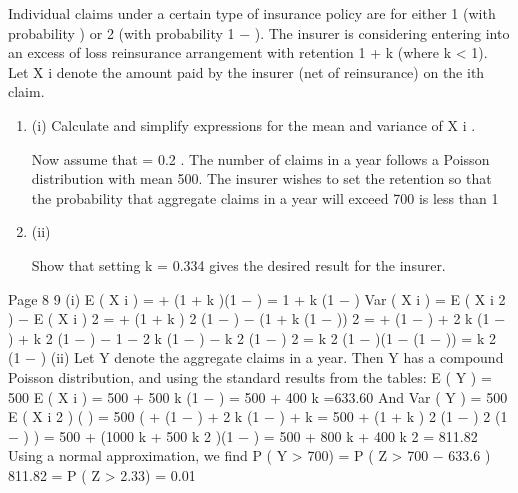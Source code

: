 



Individual claims under a certain type of insurance policy are for either 1 (with probability \alpha ) or 2 (with probability 1 − \alpha ).
The insurer is considering entering into an excess of loss reinsurance arrangement with retention 1 + k (where k < 1). Let X i denote the amount paid by the insurer (net
of reinsurance) on the ith claim.
\begin{enumerate}
\item (i) 
Calculate and simplify expressions for the mean and variance of X i .

Now assume that \alpha  = 0.2 . The number of claims in a year follows a Poisson distribution with mean 500. The insurer wishes to set the retention so that the
probability that aggregate claims in a year will exceed 700 is less than 1%
\item (ii) 

Show that setting k = 0.334 gives the desired result for the insurer.
\end{enumerate}


Page 8%
9
(i)
E ( X i ) = \alpha  + (1 + k )(1 − \alpha  )
= 1 + k (1 − \alpha  )
Var ( X i ) = E ( X i 2 ) − E ( X i ) 2
= \alpha  + (1 + k ) 2 (1 − \alpha  ) − (1 + k (1 − \alpha  )) 2
= \alpha  + (1 − \alpha  ) + 2 k (1 − \alpha  ) + k 2 (1 − \alpha  ) − 1 − 2 k (1 − \alpha  ) − k 2 (1 − \alpha  ) 2
= k 2 (1 − \alpha  )(1 − (1 − \alpha  ))
= k 2 \alpha  (1 − \alpha  )
(ii)
Let Y denote the aggregate claims in a year. Then Y has a compound Poisson
distribution, and using the standard results from the tables:
E ( Y ) = 500 \times  E ( X i ) = 500 + 500 k (1 − \alpha  ) = 500 + 400 k =633.60
And
Var ( Y ) = 500 \times  E ( X i 2 )
(
)
= 500 ( \alpha  + (1 − \alpha  ) + 2 k (1 − \alpha  ) + k
= 500 \alpha  + (1 + k ) 2 (1 − \alpha  )
2
(1 − \alpha  )
)
= 500 + (1000 k + 500 k 2 )(1 − \alpha  )
= 500 + 800 k + 400 k 2
= 811.82
Using a normal approximation, we find
P ( Y > 700) = P ( Z >
700 − 633.6
)
811.82
= P ( Z > 2.33)
= 0.01
